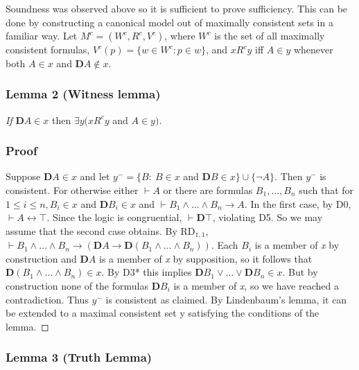 \documentclass[
  11pt,
  letterpaper,
  DIV=11,
  numbers=noendperiod,
  twoside]{scrartcl}
\begin{document}
Soundness was observed above so it is sufficient to prove sufficiency.
This can be done by constructing a canonical model out of maximally
consistent sets in a familiar way. Let \(M^c=(W^c\!, R^c\!,V^c)\), where
\(W^c\) is the set of all maximally consistent formulas,
\(V^c(p)=\{w{\in}W^c\!: p{\in}w\}\), and \(xR^cy\) iff \(A{\in}y\)
whenever both \(A{\in}x\) and \(\mathbf{D}A{\notin}x\).

\subsubsection*{Lemma 2 (Witness lemma)}\label{lemma-2-witness-lemma}

\emph{If} \(\mathbf{D}A{\in}x\) then \(\exists y (xR^cy\) and
\(A{\in}y)\).

\subsubsection*{Proof}\label{proof-8}

Suppose \(\mathbf{D}A {\in}x\) and let \(y^- = \{B{:}~ B{\in}x\) and
\(\mathbf{D}B{\in}x\}\cup\{\neg A\}\). Then \(y^-\) is consistent. For
otherwise either \(\vdash A\) or there are formulas \(B_1,{\ldots},B_n\)
such that for \(1\le i\le n, B_i{\in}x\) and \(\mathbf{D}B_i{\in}x\) and
\(\vdash B_1\wedge {\ldots}\wedge B_n\rightarrow A\). In the first case,
by D0, \(\vdash A{\leftrightarrow}\top\). Since the logic is
congruential, \(\vdash \mathbf{D}\top\), violating D5. So we may assume
that the second case obtains. By RD\(_{1,1}\),
\(\vdash B_1\wedge {\ldots}\wedge B_n\rightarrow (\mathbf{D}A\rightarrow \mathbf{D}(B_1\wedge {\ldots}\wedge B_n))\).
Each \(B_i\) is a member of \emph{x} by construction and \(\mathbf{D}A\)
is a member of \emph{x} by supposition, so it follows that
\(\mathbf{D}(B_1\wedge {\ldots}\wedge B_n){\in}x\). By D3* this implies
\(\mathbf{D}B_1\vee {\ldots}\vee \mathbf{D}B_n \in x\). But by
construction none of the formulas \(\mathbf{D}B_i\) is a member of
\emph{x}, so we have reached a contradiction. Thus \(y^-\) is consistent
as claimed. By Lindenbaum's lemma, it can be extended to a maximal
consistent set y satisfying the conditions of the lemma.~◻

\subsubsection*{Lemma 3 (Truth Lemma)}\label{lemma-3-truth-lemma}
\end{document}
